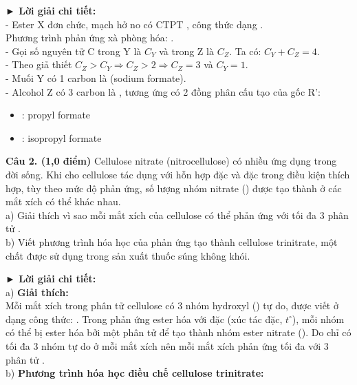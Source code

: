 \documentclass[11pt,a4paper]{article}
\begin{document}
\begin{tcolorbox}[colback=white,colframe=solBlue,arc=1mm,boxrule=0.5pt,top=2mm,bottom=2mm,left=3mm,right=3mm]
{\color{solBlue}\textbf{► Lời giải chi tiết:}}\\
- Ester X đơn chức, mạch hở no có CTPT , công thức dạng .\\
Phương trình phản ứng xà phòng hóa: .\\
- Gọi số nguyên tử C trong Y là $C_Y$ và trong Z là $C_Z$. Ta có: $C_Y + C_Z = 4$.\\
- Theo giả thiết $C_Z > C_Y \Rightarrow C_Z > 2 \Rightarrow C_Z = 3$ và $C_Y = 1$.\\
- Muối Y có 1 carbon là  (sodium formate).\\
- Alcohol Z có 3 carbon là , tương ứng có 2 đồng phân cấu tạo của gốc R':
\begin{itemize}[noitemsep,topsep=1pt]
\item {}: propyl formate
\item {}: isopropyl formate
\end{itemize}
\end{tcolorbox}

\vspace{6pt}
\noindent\textbf{Câu 2. (1,0 điểm)} Cellulose nitrate (nitrocellulose) có nhiều ứng dụng trong đời sống. Khi cho cellulose tác dụng với hỗn hợp  đặc và  đặc trong điều kiện thích hợp, tùy theo mức độ phản ứng, số lượng nhóm nitrate () được tạo thành ở các mắt xích có thể khác nhau.\\
a) Giải thích vì sao mỗi mắt xích  của cellulose có thể phản ứng với tối đa 3 phân tử .\\
b) Viết phương trình hóa học của phản ứng tạo thành cellulose trinitrate, một chất được sử dụng trong sản xuất thuốc súng không khói.

\begin{tcolorbox}[colback=white,colframe=solBlue,arc=1mm,boxrule=0.5pt,top=2mm,bottom=2mm,left=3mm,right=3mm]
{\color{solBlue}\textbf{► Lời giải chi tiết:}}\\
a) \textbf{Giải thích:}\\
Mỗi mắt xích  trong phân tử cellulose có 3 nhóm hydroxyl () tự do, được viết ở dạng công thức: . Trong phản ứng ester hóa với  đặc (xúc tác  đặc, $t^\circ$), mỗi nhóm  có thể bị ester hóa bởi một phân tử  để tạo thành nhóm ester nitrate (). Do chỉ có tối đa 3 nhóm  tự do ở mỗi mắt xích nên mỗi mắt xích phản ứng tối đa với 3 phân tử .\\
b) \textbf{Phương trình hóa học điều chế cellulose trinitrate:}\\
\centerline{}
\end{tcolorbox}
\end{document}

